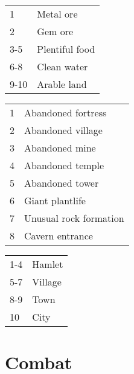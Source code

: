\begin{multicols}{2}
\begin{center}
{
\begin{xtabular}{|l|l|}
1 & Metal ore \\
2 & Gem ore \\
3-5 & Plentiful food \\
6-8 & Clean water \\
9-10 & Arable land \\
\hline
\end{xtabular}
}
\end{center}

\begin{center}
{
\begin{xtabular}{|l|l|}
1 & Abandoned fortress \\
2 & Abandoned village \\
3 & Abandoned mine \\
4 & Abandoned temple \\
5 & Abandoned tower \\
6 & Giant plantlife \\
7 & Unusual rock formation \\
8 & Cavern entrance \\
\hline
\end{xtabular}
}
\end{center}

\begin{center}
{
\begin{xtabular}{|l|l|}
1-4 & Hamlet \\
5-7 & Village \\
8-9 & Town \\
10 & City \\
\hline
\end{xtabular}
}
\end{center}

\section{Combat}


\end{multicols}
